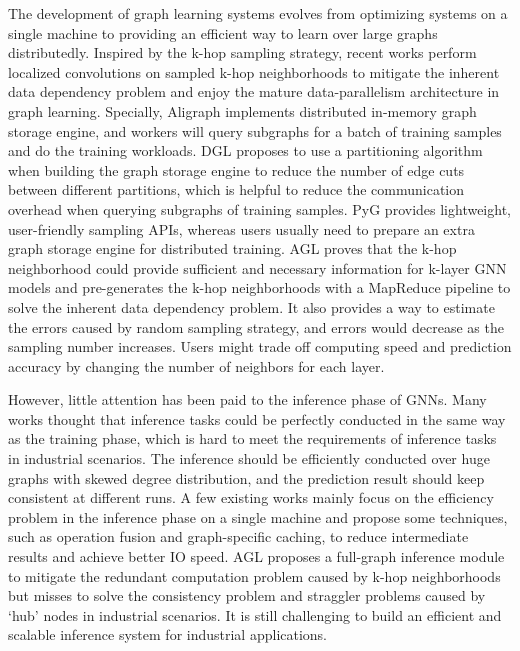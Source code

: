 \documentclass[conference]{IEEEtran}
\begin{document}
The development of graph learning systems evolves from optimizing systems on a single machine\cite{b13,b14, b35,b36} to providing an efficient way to learn over large graphs distributedly\cite{b14,b15,b16,b17}.
Inspired by the k-hop sampling strategy\cite{b4,b10}, recent works\cite{b14,b15,b16,b17} perform localized convolutions on sampled k-hop neighborhoods to mitigate the inherent data dependency problem and enjoy the mature data-parallelism architecture in graph learning.
Specially, Aligraph\cite{b16} implements distributed in-memory graph storage engine, and workers will query subgraphs for a batch of training samples and do the training workloads.
DGL\cite{b14} proposes to use a partitioning algorithm when building the graph storage engine to reduce the number of edge cuts between different partitions, which is helpful to reduce the communication overhead when querying subgraphs of training samples.
PyG\cite{b15} provides lightweight, user-friendly sampling APIs, whereas users usually need to prepare an extra graph storage engine for distributed training.
AGL\cite{b17} proves that the k-hop neighborhood could provide sufficient and necessary information for k-layer GNN models and pre-generates the k-hop neighborhoods with a MapReduce pipeline to solve the inherent data dependency problem.
It also provides a way to estimate the errors caused by random sampling strategy, and errors would decrease as the sampling number increases.
Users might trade off computing speed and prediction accuracy by changing the number of neighbors for each layer.

However, little attention has been paid to the inference phase of GNNs.
Many works thought that inference tasks could be perfectly conducted in the same way as the training phase, which is hard to meet the requirements of inference tasks in industrial scenarios. The inference should be efficiently conducted over huge graphs with skewed degree distribution, and the prediction result should keep consistent at different runs.
A few existing works\cite{b37,b38} mainly focus on the efficiency problem in the inference phase on a single machine and propose some techniques, such as operation fusion and graph-specific caching, to reduce intermediate results and achieve better IO speed.
AGL\cite{b17} proposes a full-graph inference module to mitigate the redundant computation problem caused by k-hop neighborhoods but misses to solve the consistency problem and straggler problems caused by `hub' nodes in industrial scenarios.
It is still challenging to build an efficient and scalable inference system for industrial applications.
\end{document}
